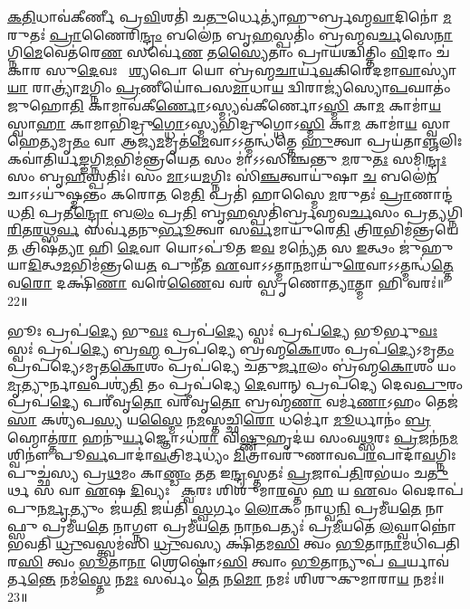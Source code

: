 \ul{𑌕}\ul{𑌤𑌿}𑌧𑌾𑌵॑𑌕𑍀𑌰𑍍𑌣𑍀 𑌪𑍍𑌰\ul{𑌵𑌿}𑌶𑌤𑌿॑ 𑌚\ul{𑌤𑍁}𑌰𑍍𑌧𑍇𑌤𑍍𑌯𑌾॑𑌹𑍁𑌰𑍍𑌬𑍍𑌰𑌹𑍍𑌮\ul{𑌵𑌾}𑌦𑌿𑌨𑍋॑ \ul{𑌮}𑌰𑍁𑌤𑌃॑ \ul{𑌪𑍍𑌰𑌾}𑌣𑍈𑌰𑌿\ul{𑌨𑍍𑌦𑍍𑌰𑌂} 𑌬𑌲𑍇॑\ul{𑌨} 𑌬𑍃\ul{𑌹}𑌸𑍍𑌪𑌤𑌿𑌂॑ 𑌬𑍍𑌰𑌹𑍍𑌮𑌵\ul{𑌰𑍍𑌚}𑌸𑍇\ul{𑌨𑌾}𑌗𑍍𑌨𑌿\ul{𑌮𑍇}𑌵𑍇𑌤॑𑌰𑍇\ul{𑌣} 𑌸𑌰𑍍𑌵𑍇॑\ul{𑌣} 𑌤\ul{𑌸𑍍𑌯𑍈}𑌤𑌾𑌂 𑌪𑍍𑌰𑌾𑌯॑𑌶𑍍𑌚𑌿𑌤𑍍𑌤𑌿𑌂 \ul{𑌵𑌿}𑌦𑌾𑌂 𑌚॑𑌕𑌾𑌰 𑌸𑍁\ul{𑌦𑍇}𑌵𑌃 𑌕𑌾᳚\ul{𑌶𑍍𑌯}𑌪𑍋 𑌯𑍋 𑌬𑍍𑌰॑𑌹𑍍𑌮\ul{𑌚𑌾}𑌰𑍍𑌯॑\ul{𑌵}𑌕𑌿𑌰𑍇॑𑌦𑌮𑌾\ul{𑌵𑌾}𑌸𑍍𑌯𑌾॑\ul{𑌯𑌾}\ul{} 𑌰𑌾𑌤𑍍𑌰𑍍𑌯𑌾॑\ul{𑌮}𑌗𑍍𑌨𑌿𑌂 \ul{𑌪𑍍𑌰}𑌣𑍀𑌯𑍋॑𑌪𑌸\ul{𑌮𑌾}𑌧𑌾\ul{𑌯} 𑌦𑍍𑌵𑌿𑌰𑌾𑌜𑍍𑌯॑𑌸𑍍𑌯𑍋\ul{𑌪}𑌘𑌾𑌤𑌂॑ 𑌜𑍁𑌹𑍋\ul{𑌤𑌿} 𑌕𑌾𑌮𑌾𑌵॑𑌕𑍀\ul{𑌰𑍍𑌣𑍋}𑌽𑌸𑍍𑌮𑍍𑌯𑌵॑𑌕𑍀𑌰𑍍𑌣𑍋𑌽\ul{𑌸𑍍𑌮𑌿} 𑌕𑌾\ul{𑌮} 𑌕𑌾𑌮𑌾॑\ul{𑌯} 𑌸𑍍𑌵𑌾\ul{𑌹𑌾} 𑌕𑌾𑌮𑌾𑌭𑌿॑𑌦𑍍𑌰𑍁\ul{𑌗𑍍𑌧𑍋}𑌽𑌸𑍍𑌮𑍍𑌯𑌭𑌿॑𑌦𑍍𑌰𑍁𑌗𑍍𑌧𑍋𑌽\ul{𑌸𑍍𑌮𑌿} 𑌕𑌾\ul{𑌮} 𑌕𑌾𑌮𑌾॑\ul{𑌯} 𑌸𑍍𑌵𑌾𑌹𑍇\ul{𑌤𑍍𑌯}𑌮𑍃\ul{𑌤𑌂} 𑌵𑌾 𑌆𑌜𑍍𑌯॑\ul{𑌮}𑌮𑍃𑌤॑\ul{𑌮𑍇}𑌵𑌾𑌽𑌽𑌤𑍍𑌮𑌨𑍍𑌧॑𑌤𑍍𑌤𑍇 \ul{𑌹𑍁}𑌤𑍍𑌵𑌾 𑌪𑍍𑌰𑌯॑𑌤𑌾\ul{𑌞𑍍𑌜}𑌲𑌿𑌃 𑌕𑌵𑌾॑𑌤𑌿𑌰𑍍𑌯\ul{𑌙𑍍𑌙}𑌗𑍍𑌨𑌿\ul{𑌮}𑌭𑌿\-𑌮॑𑌨𑍍𑌤𑍍𑌰𑌯𑍇\ul{𑌤} 𑌸𑌂 𑌮𑌾॑𑌽𑌽𑌸𑌿𑌞𑍍𑌚𑌨𑍍𑌤𑍁 \ul{𑌮}𑌰𑍁\ul{𑌤𑌃} 𑌸𑌮𑌿\ul{𑌨𑍍𑌦𑍍𑌰𑌃} 𑌸𑌂 𑌬𑍃\ul{𑌹}𑌸𑍍𑌪𑌤𑌿𑌃॑। 
𑌸𑌂 \ul{𑌮𑌾}𑌽𑌯\ul{𑌮}𑌗𑍍𑌨𑌿𑌃 𑌸𑌿॑\ul{𑌞𑍍𑌚}𑌤𑍍𑌵𑌾𑌯𑍁॑𑌷𑌾 \ul{𑌚} 𑌬𑌲𑍇॑\ul{𑌨} 𑌚𑌾𑌽𑌽𑌯𑍁॑𑌷𑍍𑌮𑌨𑍍𑌤𑌂 𑌕𑌰𑍋\ul{𑌤} 𑌮𑍇\ul{𑌤𑌿} 𑌪𑍍𑌰𑌤𑌿॑ 𑌹𑌾𑌸𑍍𑌮𑍈 \ul{𑌮}𑌰𑍁𑌤𑌃॑ \ul{𑌪𑍍𑌰𑌾}𑌣𑌾𑌨𑍍𑌦॑𑌧\ul{𑌤𑌿} 𑌪𑍍𑌰𑌤𑍀\ul{𑌨𑍍𑌦𑍍𑌰𑍋} 𑌬\ul{𑌲𑌂} 𑌪𑍍𑌰\ul{𑌤𑌿} 𑌬𑍃\ul{𑌹}𑌸𑍍𑌪𑌤𑌿॑𑌰𑍍𑌬𑍍𑌰𑌹𑍍𑌮𑌵\ul{𑌰𑍍𑌚}𑌸𑌂 𑌪𑍍𑌰\ul{𑌤𑍍𑌯}𑌗𑍍𑌨𑌿\ul{𑌰𑌿}𑌤\ul{𑌰}𑌥𑍍𑌸\ul{𑌰𑍍𑌵}\ul{} 𑌸𑌰𑍍𑌵॑𑌤𑌨𑍁\ul{𑌰𑍍𑌭𑍂}𑌤𑍍𑌵𑌾 𑌸\ul{𑌰𑍍𑌵}𑌮𑌾𑌯𑍁॑𑌰𑍇\ul{𑌤𑌿} 𑌤𑍍𑌰𑌿\ul{𑌰}𑌭𑌿𑌮॑𑌨𑍍𑌤𑍍𑌰𑌯𑍇\ul{𑌤} 𑌤𑍍𑌰𑌿𑌷॑\ul{𑌤𑍍𑌯𑌾} 𑌹𑌿 \ul{𑌦𑍇}𑌵𑌾 𑌯𑍋𑌽𑌪𑍂॑𑌤 𑌇\ul{𑌵} 𑌮𑌨𑍍𑌯𑍇॑\ul{𑌤} 𑌸 \ul{𑌇}𑌤𑍍𑌥𑌂 𑌜𑍁॑𑌹𑍁𑌯𑌾\ul{𑌦𑌿}𑌤𑍍𑌥\ul{𑌮}𑌭𑌿𑌮॑𑌨𑍍𑌤𑍍𑌰𑌯𑍇\ul{𑌤} 𑌪𑍁𑌨𑍀॑𑌤 \ul{𑌏}𑌵𑌾𑌽𑌽𑌤𑍍𑌮𑌾\ul{𑌨}𑌮𑌾𑌯𑍁॑\ul{𑌰𑍇}𑌵𑌾𑌽𑌽𑌤𑍍𑌮𑌨𑍍𑌧॑\ul{𑌤𑍍𑌤𑍇} 𑌵\ul{𑌰𑍋} 𑌦𑌕𑍍𑌷𑌿॑\ul{𑌣𑌾} 𑌵𑌰𑍇॑\ul{𑌣𑍈}𑌵 𑌵𑌰॑ 𑌸𑍍𑌪𑍃𑌣𑍋\ul{𑌤𑍍𑌯𑌾}𑌤𑍍𑌮𑌾 𑌹𑌿 𑌵𑌰𑌃॑॥22॥
\anuvakamend

𑌭𑍂𑌃 𑌪𑍍𑌰𑌪॑\ul{𑌦𑍍𑌯𑍇} 𑌭𑍁\ul{𑌵𑌃} 𑌪𑍍𑌰𑌪॑\ul{𑌦𑍍𑌯𑍇} 𑌸𑍍𑌵𑌃॑ 𑌪𑍍𑌰𑌪॑\ul{𑌦𑍍𑌯𑍇} 𑌭𑍂𑌰𑍍𑌭𑍁\ul{𑌵𑌃} 𑌸𑍍𑌵𑌃॑ 𑌪𑍍𑌰𑌪॑\ul{𑌦𑍍𑌯𑍇} 𑌬𑍍𑌰\ul{𑌹𑍍𑌮} 𑌪𑍍𑌰𑌪॑𑌦𑍍𑌯𑍇 𑌬𑍍𑌰𑌹𑍍𑌮\ul{𑌕𑍋}𑌶𑌂 𑌪𑍍𑌰𑌪॑\ul{𑌦𑍍𑌯𑍇}𑌽𑌮𑍃\ul{𑌤𑌂} 𑌪𑍍𑌰𑌪॑𑌦𑍍𑌯𑍇𑌽𑌮𑍃𑌤\ul{𑌕𑍋}𑌶𑌂 𑌪𑍍𑌰𑌪॑𑌦𑍍𑌯𑍇 𑌚𑌤𑍁\ul{𑌰𑍍𑌜𑌾}𑌲𑌂 𑌬𑍍𑌰॑𑌹𑍍𑌮\ul{𑌕𑍋}𑌶𑌂 𑌯𑌂 \ul{𑌮𑍃}𑌤𑍍𑌯𑍁𑌰𑍍𑌨𑌾\ul{𑌵}𑌪𑌶𑍍𑌯॑\ul{𑌤𑌿} 𑌤𑌂 𑌪𑍍𑌰𑌪॑𑌦𑍍𑌯𑍇 \ul{𑌦𑍇}𑌵𑌾𑌨𑍍 𑌪𑍍𑌰𑌪॑𑌦𑍍𑌯𑍇 𑌦𑍇𑌵\ul{𑌪𑍁}𑌰𑌂 𑌪𑍍𑌰𑌪॑\ul{𑌦𑍍𑌯𑍇} 𑌪𑌰𑍀॑𑌵𑍃\ul{𑌤𑍋} 𑌵𑌰𑍀॑𑌵𑍃\ul{𑌤𑍋} 𑌬𑍍𑌰𑌹𑍍𑌮॑\ul{𑌣𑌾} 𑌵𑌰𑍍𑌮॑\ul{𑌣𑌾}𑌽𑌹𑌂 𑌤𑍇𑌜॑\ul{𑌸𑌾} 𑌕𑌶𑍍𑌯॑𑌪\ul{𑌸𑍍𑌯} 𑌯\ul{𑌸𑍍𑌮𑍈} 𑌨\ul{𑌮}𑌸𑍍𑌤𑌚𑍍𑌛𑌿\ul{𑌰𑍋} 𑌧𑌰𑍍𑌮𑍋॑ \ul{𑌮𑍂}𑌰𑍍𑌧𑌾𑌨𑌂॑ \ul{𑌬𑍍𑌰}𑌹𑍍𑌮𑍋𑌤𑍍𑌤॑\ul{𑌰𑌾} 𑌹𑌨𑍁॑\ul{𑌰𑍍𑌯}𑌜𑍍𑌞𑍋𑌽𑌧॑\ul{𑌰𑌾} 𑌵𑌿\ul{𑌷𑍍𑌣𑍁}\ar{}𑌹𑍃𑌦॑𑌯 𑌸𑌂𑌵\ul{𑌥𑍍𑌸}𑌰𑌃 \ul{𑌪𑍍𑌰}𑌜𑌨॑𑌨\ul{𑌮}𑌶𑍍𑌵𑌿𑌨𑍗॑ 𑌪𑍂\ul{𑌰𑍍𑌵}𑌪𑌾𑌦𑌾॑\ul{𑌵}𑌤𑍍𑌰𑌿𑌰𑍍𑌮𑌧𑍍𑌯𑌂॑ \ul{𑌮𑌿}𑌤𑍍𑌰𑌾𑌵𑌰𑍁॑𑌣𑌾𑌵𑌪\ul{𑌰}𑌪𑌾𑌦𑌾॑\ul{𑌵}𑌗𑍍𑌨𑌿𑌃 𑌪𑍁𑌚𑍍𑌛॑𑌸𑍍𑌯 𑌪𑍍𑌰\ul{𑌥}𑌮𑌂 𑌕𑌾\ul{𑌣𑍍𑌡𑌂} 𑌤\ul{𑌤} 𑌇\ul{𑌨𑍍𑌦𑍍𑌰}𑌸𑍍𑌤𑌤𑌃॑ \ul{𑌪𑍍𑌰}𑌜𑌾𑌪॑\ul{𑌤𑌿}𑌰𑌭॑𑌯𑌂 𑌚\ul{𑌤𑍁}𑌰𑍍𑌥 𑌸 𑌵𑌾 \ul{𑌏}𑌷 \ul{𑌦𑌿}𑌵𑍍𑌯𑌃 𑌶𑌾᳚\ul{𑌕𑍍𑌵}𑌰𑌃 𑌶𑌿𑌶𑍁॑𑌮𑌾\ul{𑌰}𑌸𑍍𑌤 \ul{𑌹} 𑌯 \ul{𑌏}𑌵𑌂 𑌵𑍇𑌦𑌾𑌪॑ 𑌪𑍁𑌨\ul{𑌰𑍍𑌮𑍃}𑌤𑍍𑌯𑍁𑌂 𑌜॑𑌯\ul{𑌤𑌿} 𑌜𑌯॑𑌤𑌿 \ul{𑌸𑍍𑌵}𑌰𑍍𑌗𑌂 \ul{𑌲𑍋}𑌕𑌂 𑌨𑌾𑌧𑍍𑌵\ul{𑌨𑌿} 𑌪𑍍𑌰𑌮𑍀॑𑌯\ul{𑌤𑍇} 𑌨𑌾𑌫𑍍𑌸𑍁 𑌪𑍍𑌰𑌮𑍀॑𑌯\ul{𑌤𑍇} 𑌨𑌾𑌗𑍍𑌨𑍗 𑌪𑍍𑌰𑌮𑍀॑𑌯\ul{𑌤𑍇} 𑌨𑌾\ul{𑌨}𑌪𑌤𑍍𑌯𑌃॑ 𑌪𑍍𑌰\ul{𑌮𑍀}𑌯𑌤𑍇॑ \ul{𑌲}𑌘𑍍𑌵𑌾𑌨𑍍𑌨𑍋॑ 𑌭𑌵𑌤𑌿 \ul{𑌧𑍍𑌰𑍁}𑌵𑌸𑍍𑌤𑍍𑌵𑌮॑𑌸𑌿 \ul{𑌧𑍍𑌰𑍁}𑌵𑌸𑍍𑌯 𑌕𑍍𑌷𑌿॑𑌤𑌮\ul{𑌸𑌿} 𑌤𑍍𑌵𑌂 \ul{𑌭𑍂}𑌤𑌾\ul{𑌨𑌾}𑌮𑌧𑌿॑𑌪𑌤𑌿𑌰\ul{𑌸𑌿} 𑌤𑍍𑌵𑌂 \ul{𑌭𑍂}𑌤𑌾\ul{𑌨𑌾}\ul{} 𑌶𑍍𑌰𑍇𑌷𑍍𑌠𑍋॑𑌽\ul{𑌸𑌿} 𑌤𑍍𑌵𑌾𑌂 \ul{𑌭𑍂}𑌤𑌾𑌨𑍍𑌯𑍁𑌪॑ \ul{𑌪}𑌰𑍍𑌯𑌾𑌵॑𑌰𑍍𑌤\ul{𑌨𑍍𑌤𑍇} 𑌨𑌮॑\ul{𑌸𑍍𑌤𑍇} 𑌨\ul{𑌮𑌃} 𑌸𑌰𑍍𑌵𑌂॑ \ul{𑌤𑍇} 𑌨\ul{𑌮𑍋} 𑌨𑌮𑌃॑ 𑌶𑌿𑌶𑍁𑌕𑍁𑌮𑌾𑌰𑌾\ul{𑌯} 𑌨𑌮𑌃॑॥23॥
\anuvakamend

